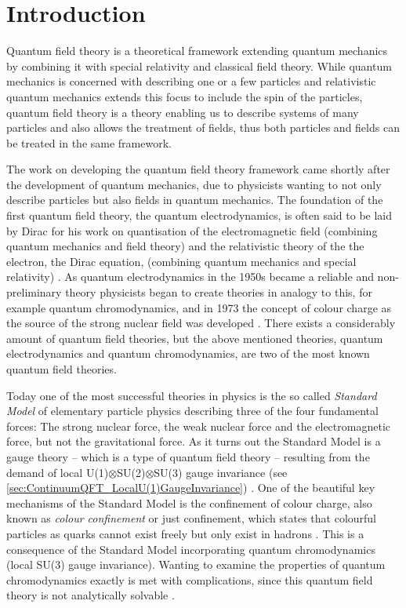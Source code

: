 \documentclass[../main.tex]{subfiles} %
\begin{document}
\chapter{Introduction} \label{chap:Introduction}

Quantum field theory is a theoretical framework extending quantum mechanics by combining it with special relativity and classical field theory. While quantum mechanics is concerned with describing one or a few particles and relativistic quantum mechanics extends this focus to include the spin of the particles, quantum field theory is a theory enabling us to describe systems of many particles and also allows the treatment of fields, thus both particles and fields can be treated in the same framework. \cite{stanford_QFT}

The work on developing the quantum field theory framework came shortly after the development of quantum mechanics, due to physicists wanting to not only describe particles but also fields in quantum mechanics. The foundation of the first quantum field theory, the quantum electrodynamics, is often said to be laid by Dirac for his work on quantisation of the electromagnetic field (combining quantum mechanics and field theory) and the relativistic theory of the the electron, the Dirac equation, (combining quantum mechanics and special relativity) \cite{stanford_historyOfQFT}. As quantum electrodynamics in the 1950s became a reliable and non-preliminary theory physicists began to create theories in analogy to this, for example quantum chromodynamics, and in 1973 the concept of colour charge as the source of the strong nuclear field was developed \cite{britannica_QCD}. There exists a considerably amount of quantum field theories, but the above mentioned theories, quantum electrodynamics and quantum chromodynamics, are two of the most known quantum field theories.

Today one of the most successful theories in physics is the so called \emph{Standard Model} of elementary particle physics \cite{peskin_introToQFT_1995} describing three of the four fundamental forces: The strong nuclear force, the weak nuclear force and the electromagnetic force, but not the gravitational force. As it turns out the Standard Model is a gauge theory -- which is a type of quantum field theory -- resulting from the demand of local U(1)$\otimes$SU(2)$\otimes$SU(3) gauge invariance (see \cref{sec:ContinuumQFT_LocalU(1)GaugeInvariance}) \cite{peskin_introToQFT_1995, stanford_historyOfQFT}.
One of the beautiful key mechanisms of the Standard Model is the confinement of colour charge, also known as \emph{colour confinement} or just confinement, which states that colourful particles as quarks cannot exist freely but only exist in hadrons \cite{peskin_introToQFT_1995, wilson_confinement_1974, griffiths_introToElementaryParticles_2008}. This is a consequence of the Standard Model incorporating quantum chromodynamics (local SU(3) gauge invariance). Wanting to examine the properties of quantum chromodynamics exactly is met with complications, since this quantum field theory is not analytically solvable \cite{fox_parallelComputingWorks_1994}.
\end{document}
